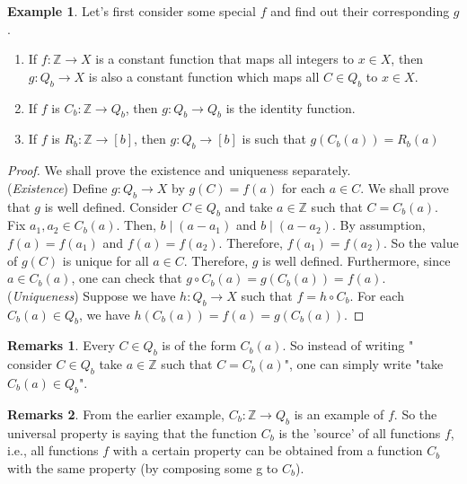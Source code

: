 \documentclass[14pt]{article}
\theoremstyle{definition}
\newtheorem*{remark}{Remarks}
\newtheorem*{example}{Example}
\begin{document}
\begin{example}
    Let's first consider some special $f$ and find out their corresponding $g$.
    \begin{enumerate}
        \item If  $f\colon \mathbb{Z}\rightarrow X$ is a constant function that maps all integers to $x\in X$,  then $g\colon Q_b\rightarrow X $ is also a constant function which maps all $C\in Q_b$ to $x\in X$.
        \item If $f$ is $C_b\colon \mathbb{Z}\rightarrow Q_b$, then  $g\colon Q_b\rightarrow Q_b $ is the identity function.
        \item If $f$ is $R_b\colon \mathbb{Z}\rightarrow [b]$, then $g\colon Q_b\rightarrow [b]$ is such that $g(C_b(a))=R_b(a)$
    \end{enumerate}
\end{example}

\begin{proof}
    We shall prove the existence and uniqueness separately.\\
    (\textit{Existence}) Define $g\colon Q_b \rightarrow X $ by $g(C)=f(a)$ for each $a\in C$. We shall prove that $g$ is well defined. Consider $C\in Q_b$ and take $a\in 
    \mathbb{Z}$ such that $C=C_b(a)$. Fix $a_1, a_2\in C_b(a) $. Then, $b\mid (a-a_1)$ and $b\mid (a-a_2)$. By assumption, $f(a)=f(a_1)$ and $f(a)=f(a_2)$. Therefore, $f(a_1)=f(a_2)$. So the value of $g(C)$ is unique for all $a\in C$. Therefore, $g$ is well defined. Furthermore,  since $a\in C_b(a)$, one can check that $g\circ C_b(a)=g(C_b(a))=f(a)$. \\
    (\textit{Uniqueness}) Suppose we have $h\colon Q_b\rightarrow X $ such that $f=h\circ C_b$. For each $C_b(a)\in Q_b$, we have $h(C_b(a))=f(a)=g(C_b(a))$.
\end{proof}

\begin{remark}
    Every $C \in Q_b$ is of the form $C_b(a)$. So instead of writing " consider $C \in Q_b$ take $a\in \mathbb{Z}$ such that $C=C_b(a)$", one can simply write "take $C_b(a)\in Q_b$".
  \end{remark}
  \begin{remark}
   From the earlier example, $C_b\colon \mathbb{Z}\rightarrow Q_b$ is an example of $f$. So the universal property is saying that the function $C_b$ is the 'source' of all functions $f$, i.e., all functions $f$ with a certain property can be obtained from a function $C_b$ with the same property (by composing some g to $C_b$).
  \end{remark}
  
\end{document}
